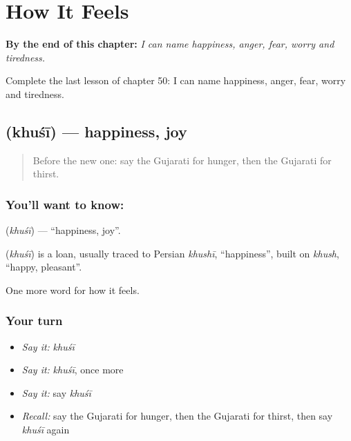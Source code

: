 
\chapter{How It Feels}
\label{ch:gu-how-it-feels}

\begin{chapteropening}
\textbf{By the end of this chapter:} \emph{I can name happiness, anger, fear, worry and tiredness.}

Complete the last lesson of chapter 50: I can name happiness, anger, fear, worry and tiredness.
\end{chapteropening}

\section[\texorpdfstring{\gu{ખુશી} (khuśī)}{ખુશી (khuśī)}]{ (khuśī) — happiness, joy}

\label{lesson:GU-C50-happiness}



\begin{quote}
Before the new one: say the Gujarati for hunger, then the Gujarati for thirst.
\end{quote}

\subsection*{You'll want to know: }
\textbf{} (\emph{khuśī}) — \textquotedblleft{}happiness, joy\textquotedblright{}.

\begin{cousinweb}
\textbf{} (\emph{khuśī}) is a loan, usually traced to Persian \emph{khushī}, \textquotedblleft{}happiness\textquotedblright{}, built on \emph{khush}, \textquotedblleft{}happy, pleasant\textquotedblright{}.
\end{cousinweb}

\begin{grammarlens}[title={What you've built}]
One more word for how it feels.
\end{grammarlens}

\subsection*{Your turn}
\begin{itemize}
\raggedright
  \item \emph{Say it:} \emph{khuśī}
  \item \emph{Say it:} \emph{khuśī}, once more
  \item \emph{Say it:} say \emph{khuśī}
  \item \emph{Recall:} say the Gujarati for hunger, then the Gujarati for thirst, then say \emph{khuśī} again
\end{itemize}

